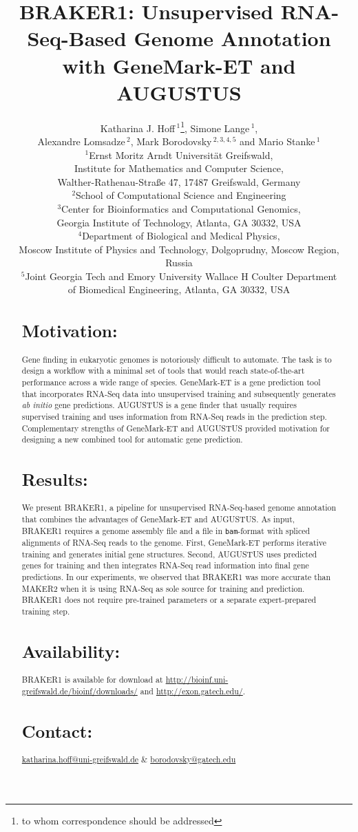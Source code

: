 \documentclass[a4paper,10pt]{article}
\title{BRAKER1: Unsupervised RNA-Seq-Based Genome Annotation with GeneMark-ET and AUGUSTUS}
\author{Katharina J. Hoff\,$^{1}$\footnote{to whom correspondence should be addressed}, Simone Lange\,$^{1}$,\\ Alexandre Lomsadze\,$^{2}$, Mark Borodovsky\,$^{2,3,4,5}$ and Mario Stanke\,$^1$\\$^{1}$Ernst Moritz Arndt Universit\"{a}t Greifswald,\\ Institute for Mathematics and Computer Science,\\ Walther-Rathenau-Stra\ss{}e 47, 17487 Greifswald, Germany\\
$^{2}$School of Computational Science and Engineering\\
$^{3}$Center for Bioinformatics and Computational Genomics, \\Georgia Institute of Technology, Atlanta, GA 30332, USA\\
$^{4}$Department of Biological and Medical Physics, \\Moscow Institute of Physics and Technology, Dolgoprudny, Moscow Region, Russia\\
$^{5}$Joint Georgia Tech and Emory University Wallace H Coulter Department\\ of Biomedical Engineering, Atlanta, GA 30332, USA}
\begin{document}
\maketitle

\begin{abstract}

\section{Motivation:}

Gene finding in eukaryotic genomes is notoriously difficult to automate. The task is to design a workflow with a minimal set of tools that would reach state-of-the-art performance across a wide range of species. GeneMark-ET is a gene prediction tool that incorporates RNA-Seq data into unsupervised training and subsequently generates \textit{ab initio} gene predictions. AUGUSTUS is a gene finder that usually requires supervised training and uses information from RNA-Seq reads in the prediction step. Complementary strengths of GeneMark-ET and AUGUSTUS provided motivation for designing a new combined tool for automatic gene prediction.

\section{Results:}
We present BRAKER1, a pipeline for unsupervised RNA-Seq-based genome annotation that combines the advantages of GeneMark-ET and AUGUSTUS. As input, BRAKER1 requires a genome assembly file and a file in \texttt{bam}-format with spliced alignments of RNA-Seq reads to the genome. First, GeneMark-ET performs iterative training and generates initial gene structures. Second, AUGUSTUS uses predicted genes for training and then integrates RNA-Seq read information into final gene predictions. In our experiments, we observed that BRAKER1 was more accurate than MAKER2 when it is using RNA-Seq as sole source for training and prediction. BRAKER1 does not require pre-trained parameters or a separate expert-prepared training step.

\section{Availability:}
BRAKER1 is available for download at \url{http://bioinf.uni-greifswald.de/bioinf/downloads/} and \url{http://exon.gatech.edu/}.

\section{Contact:} \href{katharina.hoff@uni-greifswald.de}{katharina.hoff@uni-greifswald.de} \&  \href{borodovsky@gatech.edu}{borodovsky@gatech.edu}
\end{abstract}
\end{document}
